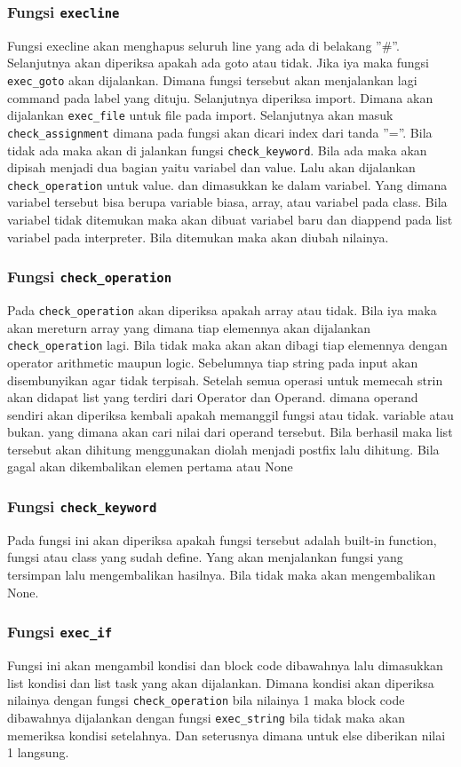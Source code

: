 \documentclass{article}
\begin{document}
\subsubsection{Fungsi \texttt{execline}}
Fungsi execline akan menghapus seluruh line yang ada di belakang ''\#''. Selanjutnya akan diperiksa apakah ada goto atau tidak. Jika iya maka fungsi \texttt{exec\_goto} akan
dijalankan. Dimana fungsi tersebut akan menjalankan lagi command pada label yang dituju.
Selanjutnya diperiksa import. Dimana akan dijalankan \texttt{exec\_file} untuk file pada import.
Selanjutnya akan masuk \texttt{check\_assignment} dimana pada fungsi akan dicari index dari tanda ''=''. Bila tidak ada maka 
akan di jalankan fungsi \texttt{check\_keyword}. Bila ada maka akan dipisah menjadi dua bagian yaitu variabel dan value. Lalu akan dijalankan \texttt{check\_operation} untuk value.
dan dimasukkan ke dalam variabel. Yang dimana variabel tersebut bisa berupa variable biasa, array, atau variabel pada class. Bila variabel tidak ditemukan
maka akan dibuat variabel baru dan diappend pada list variabel pada interpreter. Bila ditemukan maka akan diubah nilainya.
\subsubsection{Fungsi \texttt{check\_operation}}
Pada \texttt{check\_operation} akan diperiksa apakah array atau tidak. Bila
iya maka akan mereturn array yang dimana tiap elemennya akan dijalankan \texttt{check\_operation} lagi. 
Bila tidak maka akan akan dibagi tiap elemennya dengan operator arithmetic maupun logic. Sebelumnya
tiap string pada input akan disembunyikan agar tidak terpisah. Setelah semua operasi
untuk memecah strin akan didapat list yang terdiri dari Operator dan Operand. dimana
operand sendiri akan diperiksa kembali apakah memanggil fungsi atau tidak. variable atau bukan.
yang dimana akan cari nilai dari operand tersebut. Bila berhasil maka list tersebut
akan dihitung menggunakan diolah menjadi postfix lalu dihitung. Bila gagal akan dikembalikan elemen pertama atau None
\subsubsection{Fungsi \texttt{check\_keyword}}
Pada fungsi ini akan diperiksa apakah fungsi tersebut adalah built-in function, fungsi atau class yang sudah define. Yang akan menjalankan 
fungsi yang tersimpan lalu mengembalikan hasilnya. Bila tidak maka akan mengembalikan None.
\subsubsection{Fungsi \texttt{exec\_if}}
Fungsi ini akan mengambil kondisi dan block code dibawahnya lalu dimasukkan list kondisi dan list task yang akan dijalankan. Dimana kondisi akan 
diperiksa nilainya dengan fungsi \texttt{check\_operation} bila nilainya 1 maka block code dibawahnya dijalankan dengan fungsi \texttt{exec\_string}
bila tidak maka akan memeriksa
kondisi setelahnya. Dan seterusnya dimana untuk else diberikan nilai 1 langsung.
\end{document}

